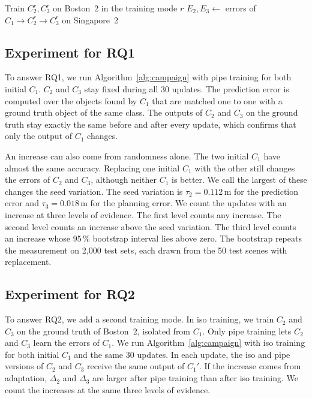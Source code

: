 \documentclass[conference]{IEEEtran}
\begin{document}
\begin{algorithm}[t]
\footnotesize
\DontPrintSemicolon
\LinesNumbered
{}
Train $C_2^{r}, C_3^{r}$ on Boston~2 in the training mode $r$\;
$E_2, E_3 \leftarrow$ errors of $C_1 \rightarrow C_2^{r} \rightarrow C_3^{r}$ on Singapore~2\;
\caption{Update procedure for one initial $C_1$ and one training mode}
\label{alg:campaign}
\end{algorithm}

\subsection{Experiment for RQ1}
To answer RQ1, we run Algorithm~\ref{alg:campaign} with pipe training for both initial $C_1$. $C_2$ and $C_3$ stay fixed during all 30 updates. The prediction error is computed over the objects found by $C_1$ that are matched one to one with a ground truth object of the same class. The outputs of $C_2$ and $C_3$ on the ground truth stay exactly the same before and after every update, which confirms that only the output of $C_1$ changes.

An increase can also come from randomness alone. The two initial $C_1$ have almost the same accuracy. Replacing one initial $C_1$ with the other still changes the errors of $C_2$ and $C_3$, although neither $C_1$ is better. We call the largest of these changes the seed variation. The seed variation is $\tau_2 = 0.112$\,m for the prediction error and $\tau_3 = 0.018$\,m for the planning error. We count the updates with an increase at three levels of evidence. The first level counts any increase. The second level counts an increase above the seed variation. The third level counts an increase whose 95\,\% bootstrap interval lies above zero. The bootstrap repeats the measurement on 2{,}000 test sets, each drawn from the 50 test scenes with replacement.

\subsection{Experiment for RQ2}
To answer RQ2, we add a second training mode. In iso training, we train $C_2$ and $C_3$ on the ground truth of Boston~2, isolated from $C_1$. Only pipe training lets $C_2$ and $C_3$ learn the errors of $C_1$. We run Algorithm~\ref{alg:campaign} with iso training for both initial $C_1$ and the same 30 updates. In each update, the iso and pipe versions of $C_2$ and $C_3$ receive the same output of $C_1'$. If the increase comes from adaptation, $\Delta_2$ and $\Delta_3$ are larger after pipe training than after iso training. We count the increases at the same three levels of evidence.
\end{document}
